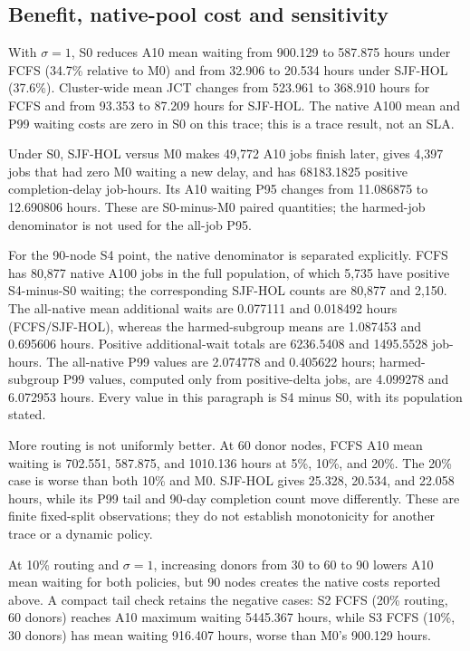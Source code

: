 \begin{table}[!ht]
\centering
\caption{Main Q3 results generated from the paper-ready JSON. Native harmed counts are paired against S0 under the same policy.}
\label{tab:q3_main}

\end{table}

\subsection{Benefit, native-pool cost and sensitivity}
With $\sigma=1$, S0 reduces A10 mean waiting from 900.129 to 587.875 hours under FCFS (34.7\% relative to M0) and from 32.906 to 20.534 hours under SJF-HOL (37.6\%). Cluster-wide mean JCT changes from 523.961 to 368.910 hours for FCFS and from 93.353 to 87.209 hours for SJF-HOL. The native A100 mean and P99 waiting costs are zero in S0 on this trace; this is a trace result, not an SLA.

Under S0, SJF-HOL versus M0 makes 49,772 A10 jobs finish later, gives 4,397 jobs that had zero M0 waiting a new delay, and has 68183.1825 positive completion-delay job-hours. Its A10 waiting P95 changes from 11.086875 to 12.690806 hours. These are S0-minus-M0 paired quantities; the harmed-job denominator is not used for the all-job P95.

For the 90-node S4 point, the native denominator is separated explicitly. FCFS has 80,877 native A100 jobs in the full population, of which 5,735 have positive S4-minus-S0 waiting; the corresponding SJF-HOL counts are 80,877 and 2,150. The all-native mean additional waits are 0.077111 and 0.018492 hours (FCFS/SJF-HOL), whereas the harmed-subgroup means are 1.087453 and 0.695606 hours. Positive additional-wait totals are 6236.5408 and 1495.5528 job-hours. The all-native P99 values are 2.074778 and 0.405622 hours; harmed-subgroup P99 values, computed only from positive-delta jobs, are 4.099278 and 6.072953 hours. Every value in this paragraph is S4 minus S0, with its population stated.

More routing is not uniformly better. At 60 donor nodes, FCFS A10 mean waiting is 702.551, 587.875, and 1010.136 hours at 5\%, 10\%, and 20\%. The 20\% case is worse than both 10\% and M0. SJF-HOL gives 25.328, 20.534, and 22.058 hours, while its P99 tail and 90-day completion count move differently. These are finite fixed-split observations; they do not establish monotonicity for another trace or a dynamic policy.

At 10\% routing and $\sigma=1$, increasing donors from 30 to 60 to 90 lowers A10 mean waiting for both policies, but 90 nodes creates the native costs reported above. A compact tail check retains the negative cases: S2 FCFS (20\% routing, 60 donors) reaches A10 maximum waiting 5445.367 hours, while S3 FCFS (10\%, 30 donors) has mean waiting 916.407 hours, worse than M0's 900.129 hours.

